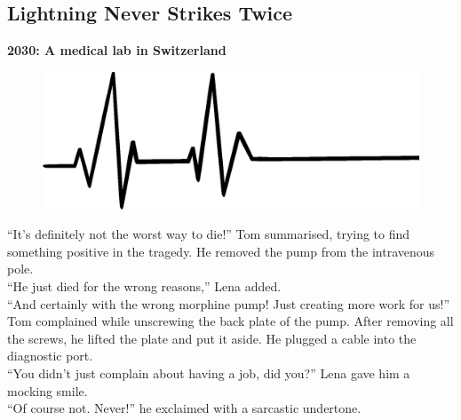 \documentclass[
  10pt,
]{scrbook}
\begin{document}
\hypertarget{lightning-never-strikes-twice}{%
\subsection*{Lightning Never Strikes Twice}\label{lightning-never-strikes-twice}}


\textbf{2030: A medical lab in Switzerland}

\begin{figure}

{\centering \includegraphics[width=\textwidth]{images/hospital} 

}

\end{figure}

``It's definitely not the worst way to die!'' Tom summarised, trying to find something positive in the tragedy.
He removed the pump from the intravenous pole.\\
``He just died for the wrong reasons,'' Lena added.\\
``And certainly with the wrong morphine pump!
Just creating more work for us!'' Tom complained while unscrewing the back plate of the pump.
After removing all the screws, he lifted the plate and put it aside.
He plugged a cable into the diagnostic port.\\
``You didn't just complain about having a job, did you?'' Lena gave him a mocking smile.\\
``Of course not. Never!'' he exclaimed with a sarcastic undertone.
\end{document}
